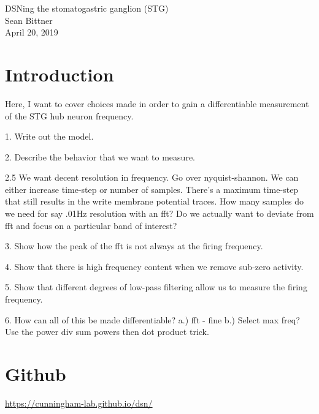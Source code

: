 \documentclass[11pt]{article}
\begin{document}
\medskip                        %

\thispagestyle{plain}
\begin{center}                  %
{\Large DSNing the stomatogastric ganglion (STG)} \\
Sean Bittner \\
April 20, 2019 \\
\end{center}

\section{Introduction}

Here, I want to cover choices made in order to gain a differentiable measurement of the STG hub neuron frequency.

1. Write out the model.

2. Describe the behavior that we want to measure.

2.5 We want decent resolution in frequency.  Go over nyquist-shannon.  We can either increase time-step or number of samples.  There's a maximum time-step that still results in the write membrane potential traces.  How many samples do we need for say .01Hz resolution with an fft?  Do we actually want to deviate from fft and focus on a particular band of interest?

3. Show how the peak of the fft is not always at the firing frequency.

4. Show that there is high frequency content when we remove sub-zero activity.

5. Show that different degrees of low-pass filtering allow us to measure the firing frequency.

6. How can all of this be made differentiable?
a.) fft - fine 
b.) Select max freq?  Use the power div sum powers then dot product trick.

\section{Github}
{\color{blue} \href{https://cunningham-lab.github.io/dsn/}{https://cunningham-lab.github.io/dsn/}} \\



\end{document}
